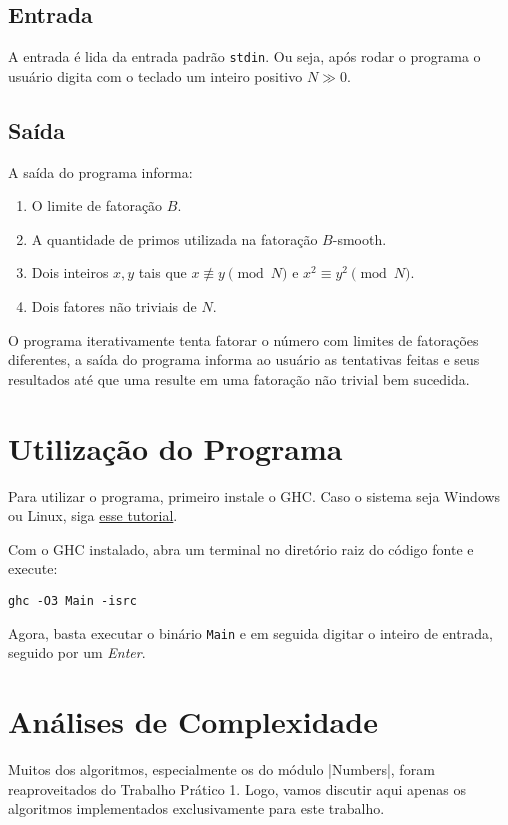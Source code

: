 \documentclass{article}
\begin{document}
\subsection{Entrada}

A entrada é lida da entrada padrão \verb|stdin|. Ou seja, após rodar o programa o usuário digita com o teclado um inteiro positivo $N \gg 0$.

\subsection{Saída}

A saída do programa informa:

\begin{enumerate}
    \item O limite de fatoração $B$.
    \item A quantidade de primos utilizada na fatoração $B$-smooth.
    \item Dois inteiros $x, y$ tais que $x \not\equiv y \pmod{N}$ e $x^2 \equiv y^2 \pmod{N}$.
    \item Dois fatores não triviais de $N$.
\end{enumerate}

O programa iterativamente tenta fatorar o número com limites de fatorações diferentes, a saída do programa informa ao usuário as tentativas feitas e seus resultados até que uma resulte em uma fatoração não trivial bem sucedida.

\section{Utilização do Programa}

Para utilizar o programa, primeiro instale o GHC. Caso o sistema seja Windows ou Linux, siga \href{https://www.haskell.org/downloads/}{esse tutorial}.

Com o GHC instalado, abra um terminal no diretório raiz do código fonte e execute:

\verb|ghc -O3 Main -isrc|

Agora, basta executar o binário \verb|Main| e em seguida digitar o inteiro de entrada, seguido por um \textit{Enter}.

\section{Análises de Complexidade}

Muitos dos algoritmos, especialmente os do módulo |Numbers|, foram reaproveitados do Trabalho Prático 1. Logo, vamos discutir aqui apenas os algoritmos implementados exclusivamente para este trabalho.
\end{document}
